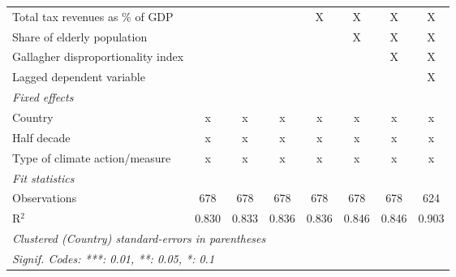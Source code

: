 \begin{table}[htbp]
\begin{tabular}{lccccccc}
      Total tax revenues as \% of GDP                                     &                &               &               & X             & X              & X              & X\\  
      Share of elderly population                                         &                &               &               &               & X              & X              & X\\  
      Gallagher disproportionality index                                  &                &               &               &               &                & X              & X\\  
      Lagged dependent variable                                           &                &               &               &               &                &                & X\\  
      \emph{Fixed effects}\\
      Country                                                             & x              & x             & x             & x             & x              & x              & x\\  
      Half decade                                                         & x              & x             & x             & x             & x              & x              & x\\  
      Type of climate action/measure                                      & x              & x             & x             & x             & x              & x              & x\\  
      \midrule \emph{Fit statistics}\\
      Observations                                                        & 678            & 678           & 678           & 678           & 678            & 678            & 624\\  
      R$^2$                                                               & 0.830          & 0.833         & 0.836         & 0.836         & 0.846          & 0.846          & 0.903\\  
      \midrule
      \multicolumn{8}{l}{\emph{Clustered (Country) standard-errors in parentheses}}\\
      \multicolumn{8}{l}{\emph{Signif. Codes: ***: 0.01, **: 0.05, *: 0.1}}\\
   \end{tabular}
\end{table}


